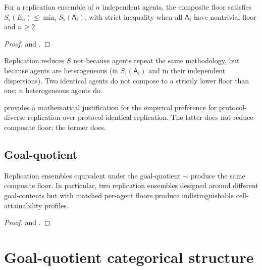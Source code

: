 \documentclass[11pt,a4paper]{article}
\newcommand{\agent}{\mathsf{A}}
\newcommand{\Sfloor}{S_{\flat}}
\begin{document}
\begin{theorem}\label{thm:rep-red}
For a replication ensemble of $n$ independent agents, the
composite floor satisfies
$\Sfloor(E_n)\le\min_i\Sfloor(\agent_i)$, with strict inequality when
all $\agent_i$ have nontrivial floor and $n\ge 2$.
\end{theorem}

\begin{proof}
 and .
\end{proof}

\begin{corollary}\label{cor:het}
Replication reduces $S$ not because agents repeat the same
methodology, but because agents are heterogeneous (in
$\Sfloor(\agent_i)$ and in their independent dispersions). Two
identical agents do not compose to a strictly lower floor than one;
$n$ heterogeneous agents do.
\end{corollary}

\begin{remark}\label{rem:pre-reg}
 provides a mathematical justification for the empirical
preference for protocol-diverse replication over protocol-identical
replication. The latter does not reduce composite floor; the former
does.
\end{remark}

\subsection{Goal-quotient}

\begin{theorem}\label{thm:gq-rep}
Replication ensembles equivalent under the goal-quotient $\sim$ produce
the same composite floor. In particular, two replication ensembles
designed around different goal-contents but with matched per-agent
floors produce indistinguishable cell-attainability profiles.
\end{theorem}

\begin{proof}
 and .
\end{proof}

\section{Goal-quotient categorical structure}
\label{sec:goal-quotient}
\end{document}
